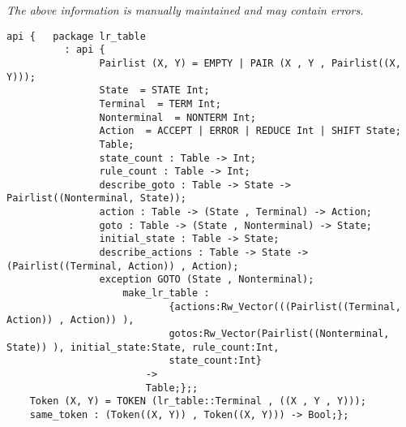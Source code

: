 \label{api:Token}

{\tiny \it The above information is manually maintained and may contain errors.}
\begin{verbatim}
api {   package lr_table
          : api {
                Pairlist (X, Y) = EMPTY | PAIR (X , Y , Pairlist((X, Y)));
                State  = STATE Int;
                Terminal  = TERM Int;
                Nonterminal  = NONTERM Int;
                Action  = ACCEPT | ERROR | REDUCE Int | SHIFT State;
                Table;
                state_count : Table -> Int;
                rule_count : Table -> Int;
                describe_goto : Table -> State -> Pairlist((Nonterminal, State));
                action : Table -> (State , Terminal) -> Action;
                goto : Table -> (State , Nonterminal) -> State;
                initial_state : Table -> State;
                describe_actions : Table -> State -> (Pairlist((Terminal, Action)) , Action);
                exception GOTO (State , Nonterminal);
                    make_lr_table :
                            {actions:Rw_Vector(((Pairlist((Terminal, Action)) , Action)) ),
                            gotos:Rw_Vector(Pairlist((Nonterminal, State)) ), initial_state:State, rule_count:Int,
                            state_count:Int}
                        ->
                        Table;};;
    Token (X, Y) = TOKEN (lr_table::Terminal , ((X , Y , Y)));
    same_token : (Token((X, Y)) , Token((X, Y))) -> Bool;};
\end{verbatim}
